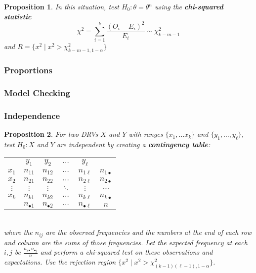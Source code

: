\documentclass[12pt]{article}
\newtheorem*{prop*}{Proposition}
\theoremstyle{definition}
\begin{document}
\begin{prop*}
  In this situation, test $H_0 : \theta = \theta^n$ using the \textbf{chi-squared statistic}
  $$\chi^2 = \sum_{i = 1}^k\frac{(O_i - E_i)^2}{E_i} \sim \chi^2_{k - m - 1}$$
  and $R = \{x^2 \mid x^2 > \chi^2_{k - m - 1,1-\alpha}\}$
\end{prop*}

\subsubsection{Proportions}

\subsubsection{Model Checking}

\subsubsection{Independence}

\begin{prop*}
  For two DRVs $X$ and $Y$ with ranges $\{x_1, \ldots x_k\}$ and $\{y_1, \ldots, y_\ell\}$, test $H_0 : X$ and $Y$ are independent by creating a \textbf{contingency table}:\\
  \begin{tabular}{cccccc}
             & $y_1$           & $y_2$           & $\ldots$ & $y_\ell$          &\\
    $x_1$    & $n_{11}$        & $n_{12}$        & $\ldots$ & $n_{1\ell}$       & $n_{1\bullet}$\\
    $x_2$    & $n_{21}$        & $n_{22}$        & $\ldots$ & $n_{2\ell}$       & $n_{2\bullet}$\\
    $\vdots$ & $\vdots$        & $\vdots$        & $\ddots$ & $\vdots$          & $\ldots$\\
    $x_k$    & $n_{k1}$        & $n_{k2}$        & $\ldots$ & $n_{k\ell}$       & $n_{k\bullet}$\\
             & $n_{\bullet 1}$ & $n_{\bullet 2}$ & $\ldots$ & $n_{\bullet\ell}$ & $n$
  \end{tabular}\\
  where the $n_{ij}$ are the observed frequencies and the numbers at the end of each row and column are the sums of those frequencies.
  Let the expected frequency at each $i, j$ be $\frac{n_{i\bullet}n_{\bullet j}}{n}$ and perform a chi-squared test on these observations and expectations.
  Use the rejection region $\{x^2 \mid x^2 > \chi^2_{(k - 1)(\ell - 1),1-\alpha}\}$.
\end{prop*}
\end{document}
